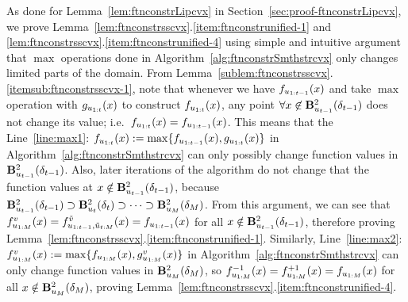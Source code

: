 As done for Lemma~\ref{lem:ftnconstrLipcvx} in Section~\ref{sec:proof-ftnconstrLipcvx}, 
we prove Lemma~\ref{lem:ftnconstrsscvx}.\ref{item:ftnconstrunified-1} and \ref{lem:ftnconstrsscvx}.\ref{item:ftnconstrunified-4} using simple and intuitive argument 
that $\max$ operations done in Algorithm~\ref{alg:ftnconstrSmthstrcvx} only changes limited parts of the domain.
From Lemma~\ref{sublem:ftnconstrsscvx}.\ref{itemsub:ftnconstrsscvx-1},
note that whenever we have $f_{u_{1:{t-1}}}(x)$ and take $\max$ operation with $g_{u_{1:{t}}}(x)$ to construct $f_{u_{1:{t}}}(x)$,
any point $\forall x \not\in \mathbf{B}^2_{u_{t-1}}({\delta_{t-1}})$ does not change its value; i.e.\ $f_{u_{1:{t}}}(x)=f_{u_{1:{t-1}}}(x)$.
This means that the Line~\ref{line:max1}: $f_{u_{1:{t}}} (x) := \max \{ f_{u_{1:{t-1}}} (x), g_{u_{1:{t}}}(x) \}$ in Algorithm~\ref{alg:ftnconstrSmthstrcvx}
can only possibly change function values in $\mathbf{B}^2_{u_{t-1}}({\delta_{t-1}})$.
Also, later iterations of the algorithm do not change that the function values at $x \notin \mathbf{B}^2_{u_{t-1}}({\delta_{t-1}})$, 
because $\mathbf{B}^2_{u_{t-1}}({\delta_{t-1}}) \supset \mathbf{B}^2_{u_{t}}({\delta_{t}}) \supset \cdots \supset \mathbf{B}^2_{u_{M}}({\delta_{M}})$.
From this argument, we can see that $f_{u_{1:M}}^v(x) = f_{u_{1:t-1}, \tilde u_{t:M}}^{\tilde v}(x) = f_{u_{1:{t-1}}}(x)$ for all $x \notin \mathbf{B}^2_{u_{t-1}}({\delta_{t-1}})$, 
therefore proving Lemma~\ref{lem:ftnconstrsscvx}.\ref{item:ftnconstrunified-1}. 
Similarly, Line~\ref{line:max2}: $f_{u_{1:M}}^v(x) := \max \{ f_{u_{1:{M}}}(x), g^{v}_{u_{1:M}}(x) \}$ in Algorithm~\ref{alg:ftnconstrSmthstrcvx}
can only change function values in $\mathbf{B}^2_{u_{M}}({\delta_{M}})$, 
so $f_{u_{1:M}}^{-1}(x) = f_{u_{1:M}}^{+1}(x) = f_{u_{1:{M}}}(x)$ for all $x \notin \mathbf{B}^2_{u_{M}}({\delta_{M}})$, proving Lemma~\ref{lem:ftnconstrsscvx}.\ref{item:ftnconstrunified-4}.

